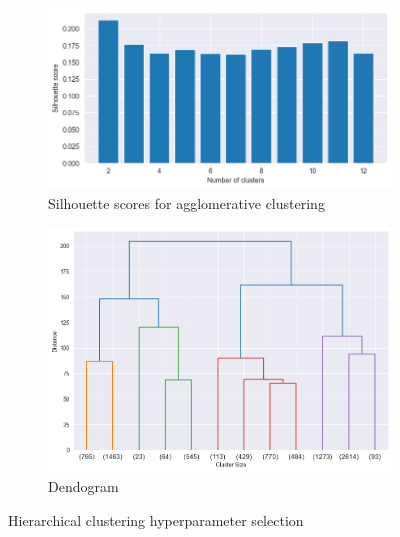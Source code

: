 \begin{figure}[H]
    \hspace*{\fill}
    \centering
    \begin{subfigure}[b]{0.45\textwidth}
        \centering
        \includegraphics[width=1.0\textwidth]{src/figs/silhouette_agglomerative.png} 
        \caption{Silhouette scores for agglomerative clustering}\label{fig:silhouette_agglomerative}
    \end{subfigure}
    \hfill
    \begin{subfigure}[b]{0.45\textwidth}
        \centering
        \includegraphics[width=1.0\textwidth]{src/figs/dendogram.png} 
        \caption{Dendogram}\label{fig:dendogram}
    \end{subfigure}\label{fig:silhouette_dendogram}
    \caption{Hierarchical clustering hyperparameter selection}\label{fig:hyperparameters_hierarchical}
    \hspace*{\fill}
\end{figure}



